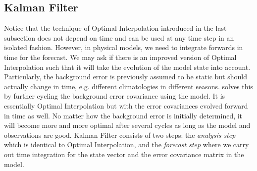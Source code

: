 \subsection{Kalman Filter}

Notice that the technique of Optimal Interpolation introduced in the last subsection does not depend on time and can be used at any time step in an isolated fashion. However, in physical models, we need to integrate forwards in time for the forecast. We may ask if there is an improved version of Optimal Interpolation such that it will take the evolution of the model state into account. Particularly, the background error is previously assumed to be static but should actually change in time, e.g. different climatologies in different seasons.  solves this by further cycling the background error covariance using the model. It is essentially Optimal Interpolation but with the error covariances evolved forward in time as well. No matter how the background error is initially determined, it will become more and more optimal after several cycles as long as the model and observations are good. Kalman Filter consists of two steps: the \textit{analysis step} which is identical to Optimal Interpolation, and the \textit{forecast step} where we carry out time integration for the state vector and the error covariance matrix in the model.\par

